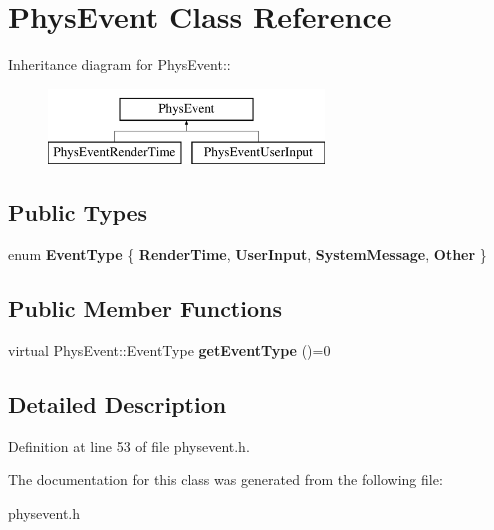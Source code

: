 \hypertarget{classPhysEvent}{
\section{PhysEvent Class Reference}
\label{d9/dc2/classPhysEvent}
}
Inheritance diagram for PhysEvent::\begin{figure}[H]
\begin{center}
\leavevmode
\includegraphics[height=2cm]{d9/dc2/classPhysEvent}
\end{center}
\end{figure}
\subsection*{Public Types}
\begin{DoxyCompactItemize}
\item 
enum {\bfseries EventType} \{ {\bfseries RenderTime}, 
{\bfseries UserInput}, 
{\bfseries SystemMessage}, 
{\bfseries Other}
 \}
\end{DoxyCompactItemize}
\subsection*{Public Member Functions}
\begin{DoxyCompactItemize}
\item 
\hypertarget{classPhysEvent_a23e053ac5e5e8475215e42c34ea6bf78}{
virtual PhysEvent::EventType {\bfseries getEventType} ()=0}
\label{d9/dc2/classPhysEvent_a23e053ac5e5e8475215e42c34ea6bf78}

\end{DoxyCompactItemize}


\subsection{Detailed Description}


Definition at line 53 of file physevent.h.

The documentation for this class was generated from the following file:\begin{DoxyCompactItemize}
\item 
physevent.h\end{DoxyCompactItemize}
